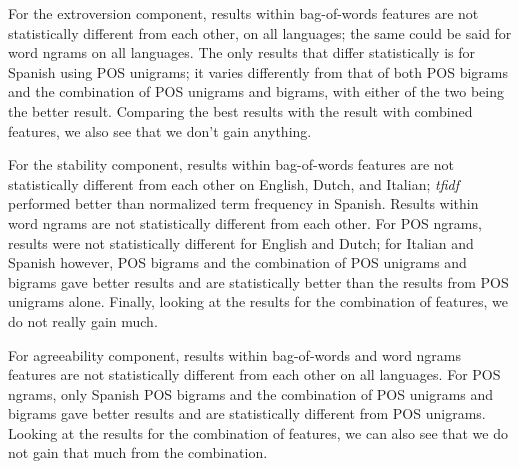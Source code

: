 \documentclass[a4paper]{llncs}
\begin{document}

For the extroversion component, results within bag-of-words features are not statistically different from each other, on all languages; the same could be said for word ngrams on all languages. The only results that differ statistically is for Spanish using POS unigrams; it varies differently from that of both POS bigrams and the combination of POS unigrams and bigrams, with either of the two being the better result. Comparing the best results with the result with combined features, we also see that we don't gain anything. 

For the stability component, results within bag-of-words features are not statistically different from each other on English, Dutch, and Italian; \textit{tfidf} performed better than normalized term frequency in Spanish. Results within word ngrams are not statistically different from each other. For POS ngrams, results were not statistically different for English and Dutch; for Italian and Spanish however, POS bigrams and the combination of POS unigrams and bigrams gave better results and are statistically better than the results from POS unigrams alone. Finally, looking at the results for the combination of features, we do not really gain much. 

For agreeability component, results within bag-of-words and word ngrams features are not statistically different from each other on all languages. For POS ngrams, only Spanish POS bigrams and the combination of POS unigrams and bigrams gave better results and are statistically different from POS unigrams. Looking at the results for the combination of features, we can also see that we do not gain that much from the combination.
\end{document}

